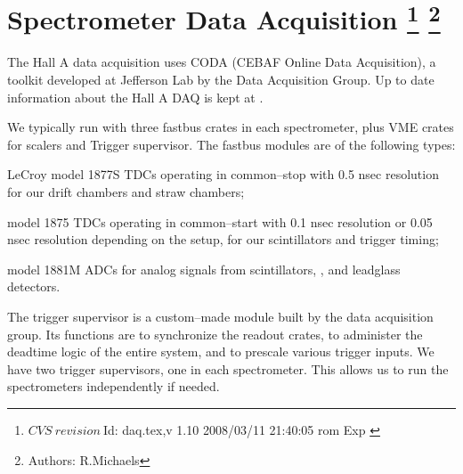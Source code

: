 \chapter[Spectrometer Data Acquisition]{Spectrometer Data Acquisition
\footnote{
  $CVS~revision~ $Id: daq.tex,v 1.10 2008/03/11 21:40:05 rom Exp $ $
}
\footnote{Authors: R.Michaels }
}




\par
The Hall A data acquisition uses CODA\cite{CODAwww}
(CEBAF Online Data Acquisition), a toolkit
developed at Jefferson Lab by the Data
Acquisition Group. 
Up to date information about the Hall A DAQ
is kept at 
.

\par
We typically run with three fastbus crates in
each spectrometer, plus VME crates for scalers and Trigger supervisor.
The fastbus modules are of the following
types:
\begin{list}{.~}{\setlength{\itemsep}{-0.15cm}}
  \item LeCroy model
    1877S TDCs operating in common--stop with 0.5 nsec
    resolution for our drift chambers and
    straw chambers; 
  \item model 1875 TDCs operating in common--start with 0.1 nsec resolution
      or 0.05 nsec resolution depending on the setup,
      for our scintillators and trigger timing;
  \item model 1881M ADCs for analog signals from scintillators, 
        \Cherenkov{}, and leadglass detectors.
\end{list}

\par
The trigger supervisor is a custom--made
module built by the data
acquisition group.  Its functions are to
synchronize the readout crates, to administer
the deadtime logic of the entire system, and
to prescale various trigger inputs.  
We have two trigger supervisors,
one in each spectrometer.  This allows us to
run the spectrometers independently if needed.

